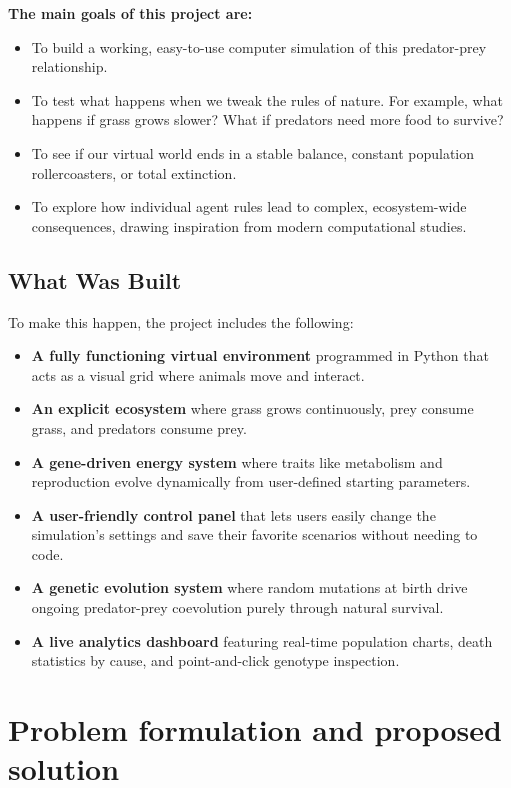 \documentclass[english]{projectreport}
\begin{document}
\noindent \textbf{The main goals of this project are:}
\begin{itemize}
    \item To build a working, easy-to-use computer simulation of this predator-prey relationship.
    \item To test what happens when we tweak the rules of nature. For example, what happens if grass grows slower? What if predators need more food to survive?
    \item To see if our virtual world ends in a stable balance, constant population rollercoasters, or total extinction.
    \item To explore how individual agent rules lead to complex, ecosystem-wide consequences, drawing inspiration from modern computational studies.
\end{itemize}

\subsection{What Was Built}
To make this happen, the project includes the following:
\begin{itemize}
    \item \textbf{A fully functioning virtual environment} programmed in Python that acts as a visual grid where animals move and interact.
    \item \textbf{An explicit ecosystem} where grass grows continuously, prey consume grass, and predators consume prey.
    \item \textbf{A gene-driven energy system} where traits like metabolism and reproduction evolve dynamically from user-defined starting parameters.
    \item \textbf{A user-friendly control panel} that lets users easily change the simulation's settings and save their favorite scenarios without needing to code.
    \item \textbf{A genetic evolution system} where random mutations at birth drive ongoing predator-prey coevolution purely through natural survival.
    \item \textbf{A live analytics dashboard} featuring real-time population charts, death statistics by cause, and point-and-click genotype inspection.
\end{itemize}
\section{Problem formulation and proposed solution}
\label{sec:problem}
\end{document}
